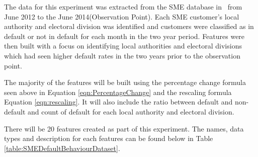 The data for this experiment was extracted from the SME database in \subjectname\ from June 2012 to the June 2014(Observation Point). Each SME customer's local authority and electoral division was identified and customers were classified as in default or not in default for each month in the two year period. Features were then built with a focus on identifying local authorities and electoral divisions which had seen higher default rates in the two years prior to the observation point. 

The majority of the features will be built using the percentage change formula seen above in Equation \ref{eqn:PercentageChange} and the rescaling formula Equation \ref{eqn:rescaling}. It will also include the ratio between default and non-default and count of default for each local authority and electoral division.

There will be 20 features created as part of this experiment. The names, data types and description for each features can be found below in Table \ref{table:SMEDefaultBehaviourDataset}.

